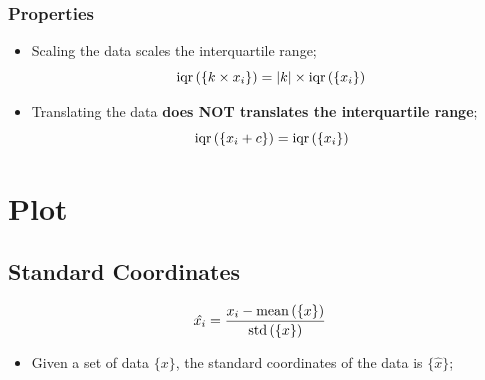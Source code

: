     \subsubsection{Properties}
    
      \begin{itemize}
        \item Scaling the data scales the interquartile range;
        \begin{equation}
          \operatorname{iqr} \left( \{ k \times x_{i} \} \right) = \left| k \right| \times \operatorname{iqr} \left( \{ x_{i} \} \right)
        \end{equation}
        
        \item Translating the data \textbf{does NOT translates the interquartile range};
        \begin{equation}
          \operatorname{iqr} \left( \{ x_{i} + c \} \right) = \operatorname{iqr} \left( \{ x_{i} \} \right)
        \end{equation}
      \end{itemize}
    
\section{Plot}

  \subsection{Standard Coordinates}
  
    \begin{equation}
      \hat{x_{i}} = \frac{ x_{i} - \operatorname{mean}\left( \{ x \} \right) }{ \operatorname{std} \left( \{ x \} \right) }
    \end{equation}
  
    \begin{itemize}
      \item Given a set of data $ \{ x \} $, the standard coordinates of the data is $ \{ \hat{x} \} $;
    \end{itemize}
  
